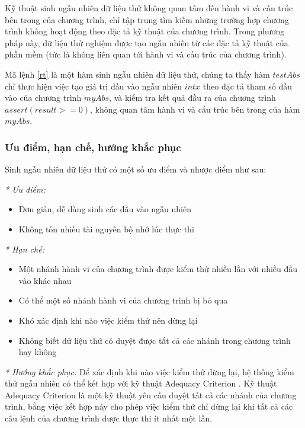 Kỹ thuật sinh ngẫu nhiên dữ liệu thử không quan tâm đến hành vi và cấu trúc bên trong của chương trình, chỉ tập trung tìm kiếm những trường hợp chương trình không hoạt động theo đặc tả kỹ thuật của chương trình. Trong phương pháp này, dữ liệu thử nghiệm được tạo ngẫu nhiên từ các đặc tả kỹ thuật của phần mềm (tức là không liên quan tới hành vi và cấu trúc của chương trình).


Mã lệnh \ref{rt} là một hàm sinh ngẫu nhiên dữ liệu thử, chúng ta thấy hàm $testAbs$ chỉ thực hiện việc tạo giá trị đầu vào ngẫu nhiên $int x$ theo đặc tả tham số đầu vào của chương trình $myAbs$, và kiểm tra kết quả đầu ra của chương trình $assert(result >= 0)$, không quan tâm hành vi và cấu trúc bên trong của hàm $myAbs$.

\subsubsection*{Ưu điểm, hạn chế, hướng khắc phục}
Sinh ngẫu nhiên dữ liệu thử có một số ưu điểm và nhược điểm như sau:

\textit{* Ưu điểm:}
\begin{itemize}
	\item Đơn giản, dễ dàng sinh các đầu vào ngẫu nhiên
	\item Không tốn nhiều tài nguyên bộ nhớ lúc thực thi
\end{itemize}

\textit{* Hạn chế:}
\begin{itemize}
	\item Một nhánh hành vi của chương trình được kiểm thử nhiều lần với nhiều đầu vào khác nhau
	\item Có thể một số nhánh hành vi của chương trình bị bỏ qua
	\item Khó xác định khi nào việc kiểm thử nên dừng lại
	\item Không biết dữ liệu thử có duyệt được tất cả các nhánh trong chương trình hay không
\end{itemize}

\textit{* Hướng khắc phục:}
Để xác định khi nào việc kiểm thử dừng lại, hệ thống kiểm thử ngẫu nhiên có thể kết hợp với kỹ thuật Adequacy Criterion \cite{zhu1997software}. Kỹ thuật Adequacy Criterion là một kỹ thuật yêu cầu duyệt tất cả các nhánh của chương trình, bằng việc kết hợp này cho phép việc kiểm thử chỉ dừng lại khi tất cả các câu lệnh của chương trình được thực thi ít nhất một lần.

